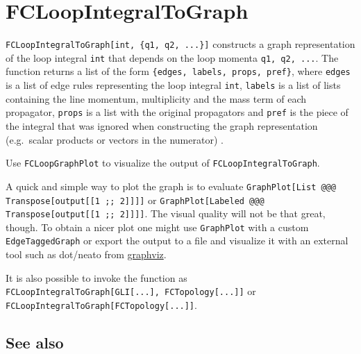 \documentclass[../FeynCalcManual.tex]{subfiles}
\begin{document}
\begin{Shaded}
\begin{Highlighting}[]
 
\end{Highlighting}
\end{Shaded}

\hypertarget{fcloopintegraltograph}{
\section{FCLoopIntegralToGraph}\label{fcloopintegraltograph}}

\texttt{FCLoopIntegralToGraph[\allowbreak{}int,\ \allowbreak{}\{\allowbreak{}q1,\ \allowbreak{}q2,\ \allowbreak{}...\}]}
constructs a graph representation of the loop integral \texttt{int} that
depends on the loop momenta
\texttt{q1,\ \allowbreak{}q2,\ \allowbreak{}...}. The function returns a
list of the form
\texttt{\{\allowbreak{}edges,\ \allowbreak{}labels,\ \allowbreak{}props,\ \allowbreak{}pref\}},
where \texttt{edges} is a list of edge rules representing the loop
integral \texttt{int}, \texttt{labels} is a list of lists containing the
line momentum, multiplicity and the mass term of each propagator,
\texttt{props} is a list with the original propagators and \texttt{pref}
is the piece of the integral that was ignored when constructing the
graph representation (e.g.~scalar products or vectors in the numerator)
.

Use \texttt{FCLoopGraphPlot} to visualize the output of
\texttt{FCLoopIntegralToGraph}.

A quick and simple way to plot the graph is to evaluate
\texttt{GraphPlot[\allowbreak{}List @@@ Transpose[\allowbreak{}output[\allowbreak{}[\allowbreak{}1 ;; 2]]]]}
or
\texttt{GraphPlot[\allowbreak{}Labeled @@@ Transpose[\allowbreak{}output[\allowbreak{}[\allowbreak{}1 ;; 2]]]]}.
The visual quality will not be that great, though. To obtain a nicer
plot one might use \texttt{GraphPlot} with a custom
\texttt{EdgeTaggedGraph} or export the output to a file and visualize it
with an external tool such as dot/neato from
\href{https://graphviz.org/}{graphviz}.

It is also possible to invoke the function as
\texttt{FCLoopIntegralToGraph[\allowbreak{}GLI[\allowbreak{}...],\ \allowbreak{}FCTopology[\allowbreak{}...]]}
or
\texttt{FCLoopIntegralToGraph[\allowbreak{}FCTopology[\allowbreak{}...]]}.

\subsection{See also}
\end{document}
